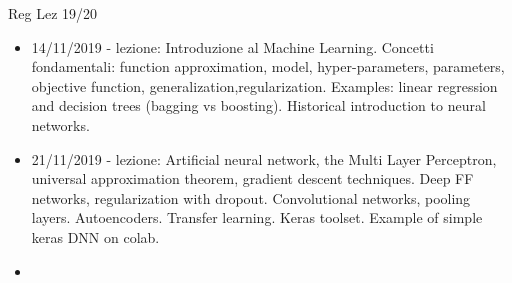 \begin{frame}[allowframebreaks]{Reg Lez 19/20}
\begin{itemize}[resume]
\item 14/11/2019 - lezione: Introduzione al Machine Learning. Concetti fondamentali: function approximation, model, hyper-parameters, parameters, objective function, generalization,regularization. Examples: linear regression and decision trees (bagging vs boosting). Historical introduction to neural networks.
\item 21/11/2019 - lezione: Artificial neural network, the Multi Layer Perceptron, universal approximation theorem, gradient descent techniques. Deep FF networks, regularization with dropout. Convolutional networks, pooling layers. Autoencoders. Transfer learning. Keras toolset. Example of simple keras DNN on colab.
\end{itemize}


\begin{itemize}[resume]
\item
\end{itemize}
\end{frame}